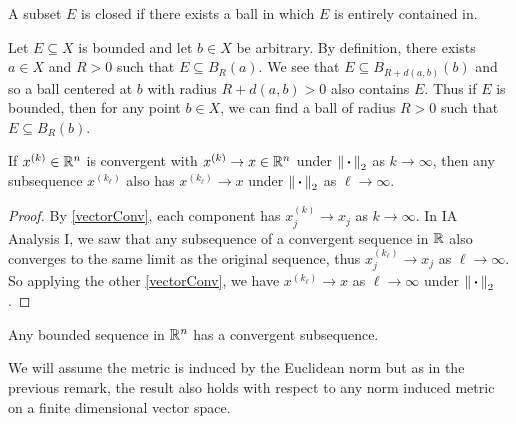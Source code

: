 \documentclass[../main.tex]{subfiles}
\begin{document}
\begin{remark}[Intuition]
  A subset $E$ is closed if there exists a ball in which $E$ is entirely contained in.
\end{remark}
\begin{remark}
  Let $E \subseteq X$ is bounded and let $b \in X$ be arbitrary.
  By definition, there exists $a \in X$ and $R > 0$ such that $E \subseteq B_R(a)$.
  We see that $E \subseteq B_{R + d(a, b)}(b)$ and so a ball centered at $b$ with radius $R + d(a, b) > 0$ also contains $E$.
  Thus if $E$ is bounded, then for any point $b \in X$, we can find a ball of radius $R > 0$ such that $E \subseteq B_{R}(b)$.
\end{remark}
\begin{corollary}
  If $x^{(k)} \in \mathbb{R}^{n}$ is convergent with $x^{(k)} \to x \in \mathbb{R}^{n}$ under $\left\lVert {\hspace{0.18em}\boldsymbol{\cdot}\hspace{0.18em}} \right\rVert_2$ as $k \to \infty$, then any subsequence $x^{(k_\ell)}$ also has $x^{(k_{\ell})} \to x$ under $\left\lVert {\hspace{0.18em}\boldsymbol{\cdot}\hspace{0.18em}} \right\rVert_2$ as $\ell \to \infty$. \label{subseqConv}
\end{corollary}
\begin{proof}
  By \cref{vectorConv}, each component has $x^{(k)}_j \to x_j$ as $k \to \infty$.
In IA Analysis I, we saw that any subsequence of a convergent sequence in $\mathbb{R}$ also converges to the same limit as the original sequence, thus $x^{(k_{\ell})}_j \to x_j$ as $\ell \to \infty$.
So applying the other \cref{vectorConv}, we have $x^{(k_{\ell})} \to x$ as $\ell \to \infty$ under $\left\lVert {\hspace{0.18em}\boldsymbol{\cdot}\hspace{0.18em}} \right\rVert_2$.
\end{proof}
\begin{proposition}
  Any bounded sequence in $\mathbb{R}^n$ has a convergent subsequence. \label{BWRn}
\end{proposition}
We will assume the metric is induced by the Euclidean norm but as in the previous remark, the result also holds with respect to any norm induced metric on a finite dimensional vector space.
\end{document}
